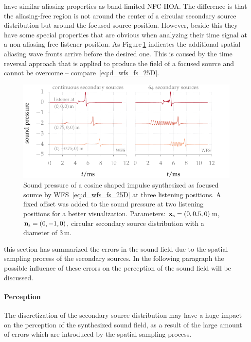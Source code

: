  have similar aliasing properties as band-limited
\ac{NFC-HOA}. The difference is that the aliasing-free region is not around
the center of a circular secondary source distribution but around the
focused source position.
However, beside this they have some special properties that are obvious when
analyzing their time signal at a non aliasing free listener position. As
Figure\,\ref{fig:sound_field_imp_fixed_fs} indicates the additional
spatial aliasing wave fronts arrive before the desired one. This
is caused by the
time reversal approach\autocite{Yon2003} that is applied to produce the field
of a focused source and cannot be overcome -- compare~\eqref{eq:d_wfs_fs_25D}.
%
\begin{figure}[t]
    \includegraphics{fig3_16/fig3_16}
    \caption{Sound pressure of a cosine shaped impulse synthesized as focused
    source by \ac{WFS}~\protect\eqref{eq:d_wfs_fs_25D} at three listening
    positions. A fixed offset was added to the sound pressure at two listening
    positions for a better visualization.
    Parameters: $\mathbf{x}_\text{s} = (0,0.5,0)$\,m, $\mathbf{n}_\text{s} = (0,-1,0)$, circular
    secondary source distribution with a diameter of $3$\,m.
    }
    \label{fig:sound_field_imp_fixed_fs}
    \vspace{-0.7cm}
\end{figure}

 this section has summarized the errors in the sound field due
to the spatial sampling process of the secondary sources. In the following paragraph
the possible influence of these errors on the perception of the sound field will be
discussed.


\paragraph{Perception}
%
The discretization of the secondary source distribution may have a huge impact
on the perception of the synthesized sound field, as a result of the large amount
of errors which are introduced by the spatial sampling process.


